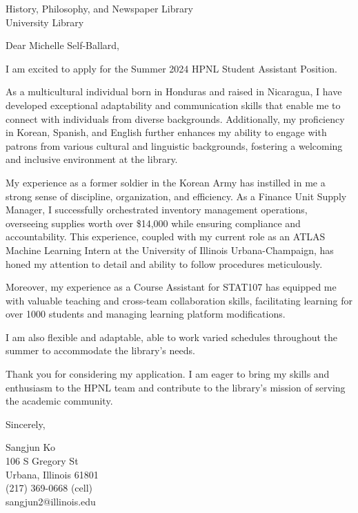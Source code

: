 \documentclass{letter}
\begin{document}
\begin{letter}{
    History, Philosophy, and Newspaper Library\\
    University Library\\
}


\opening{Dear Michelle Self-Ballard,}


I am excited to apply for the Summer 2024 HPNL Student Assistant Position. 

As a multicultural individual born in Honduras and raised in Nicaragua, I have developed exceptional adaptability 
and communication skills that enable me to connect with individuals from diverse backgrounds.
 Additionally, my proficiency in Korean, Spanish, and English further enhances my ability to 
 engage with patrons from various cultural and linguistic backgrounds, fostering a welcoming and inclusive environment at the library.

My experience as a former soldier in the Korean Army has instilled in me a strong sense of discipline, 
organization, and efficiency. As a Finance Unit Supply Manager, I successfully orchestrated 
inventory management operations, overseeing supplies worth over \$14,000 while ensuring compliance and accountability.
 This experience, coupled with my current role as an ATLAS Machine Learning Intern at the University of Illinois Urbana-Champaign, 
 has honed my attention to detail and ability to follow procedures meticulously.

 Moreover, my experience as a Course Assistant for STAT107 has equipped me with valuable teaching
  and cross-team collaboration skills, facilitating learning for over 1000 students and managing learning platform modifications.

I am also flexible and adaptable, able to work varied schedules throughout the summer
 to accommodate the library's needs.

Thank you for considering my application. I am eager to bring my skills and enthusiasm 
to the HPNL team and contribute to the library's mission of serving the academic community. 

\closing{Sincerely,
}

Sangjun Ko\\
106 S Gregory St\\
Urbana, Illinois 61801\\
(217) 369-0668 (cell)\\sangjun2@illinois.edu
\end{letter}
\end{document}
